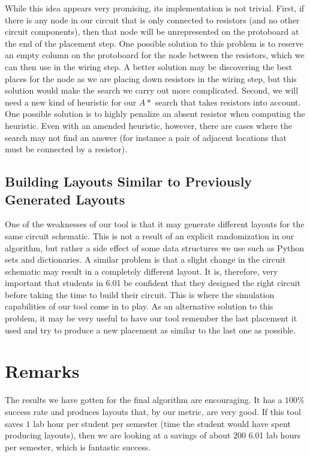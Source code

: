 While this idea appears very promising, its implementation is not trivial.
First, if there is any node in our circuit that is only
connected to resistors (and no other circuit components), then that node will be
unrepresented on the protoboard at the end of the placement step. One possible
solution to this problem is to reserve an empty column on the
protoboard for the node between the resistors, which we can then use in the
wiring step. A better solution may
be discovering the best places for the node as we are placing down resistors in
the wiring step, but this solution would make the search we carry out
more complicated. Second, we will need a new kind of heuristic for our $A*$
search that takes resistors into account. One possible solution is to highly
penalize an absent resistor when computing the heuristic.
Even with an amended heuristic, however, there
are cases where the search may not find an answer (for instance a pair of
adjacent locations that must be connected by a resistor).

\subsection{Building Layouts Similar to Previously Generated Layouts}

One of the weaknesses of our tool is that it may generate different layouts for
the same circuit schematic. This is not a result of an explicit randomization
in our algorithm, but rather a side effect of some data structures we use such
as Python sets and dictionaries. A similar problem is that a slight change in
the circuit schematic may result in a completely different layout. It is,
therefore, very important that students in 6.01 be confident that they designed
the right circuit before taking the time to build their circuit.
This is where the simulation
capabilities of our tool come in to play. As an alternative solution to this
problem, it may be very useful to have our
tool remember the last placement it used and try to produce a new placement as
similar to the last one as possible.

\section{Remarks}

The results we have gotten for the final algorithm are encouraging.
It has a $100\%$ success rate and produces layouts that, by our metric, are very
good. If this tool saves $1$ lab hour per student per semester (time the
student would have spent producing layouts), then we are
looking at a savings of about $200$ 6.01 lab hours per semester, which is
fantastic success.
